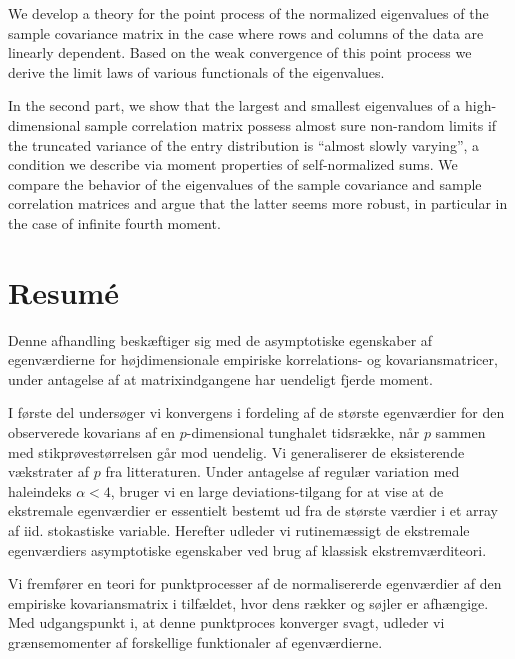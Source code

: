 We develop a theory for the point process of the normalized eigenvalues
of the sample covariance matrix in the case where rows and columns of the data are linearly dependent. Based on the weak convergence of this point process we derive the limit laws of various functionals of the eigenvalues.

In the second part, we show that the largest and smallest eigenvalues 
of a high-dimensional sample correlation matrix possess almost sure non-random limits if the truncated variance of the entry distribution is ``almost slowly varying'', a condition we describe via moment properties of self-normalized sums. We compare the behavior of the eigenvalues of the sample covariance and sample correlation matrices and argue that the latter seems more robust, in particular in the case of infinite fourth moment.
   


\section*{Resum{\'e}}

Denne afhandling beskæftiger sig med de asymptotiske egenskaber af egenværdierne for højdimensionale empiriske korrelations- og kovariansmatricer, under antagelse af at matrixindgangene har uendeligt fjerde moment.



I første del undersøger vi konvergens i fordeling af de 
største egenværdier for den observerede kovarians af en $p$-dimensional tunghalet tidsrække, når
$p$ sammen med stikprøvestørrelsen går mod uendelig.  
Vi generaliserer de eksisterende vækstrater 
af $p$ 
fra litteraturen.  Under antagelse af regulær variation med haleindeks $\alpha < 4$, bruger vi en 
large deviations-tilgang for at vise at de ekstremale egenværdier er essentielt bestemt ud fra de største værdier i et array af iid. stokastiske variable.
Herefter udleder vi rutinemæssigt de ekstremale egenværdiers asymptotiske egenskaber ved brug af klassisk 
ekstremværditeori.

Vi fremfører en teori
for punktprocesser af de normalisererde egenværdier af den empiriske kovariansmatrix i tilfældet, hvor dens rækker og søjler er afhængige. Med udgangspunkt i, at denne punktproces konverger svagt, udleder vi grænsemomenter af 
forskellige funktionaler af egenværdierne.

